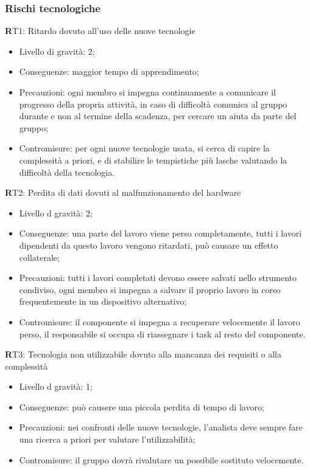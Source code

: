 \subsubsection{Rischi tecnologiche}
\textbf RT1:
 Ritardo dovuto all'uso delle nuove tecnologie
\begin{itemize}
\item Livello di gravità: 2;
\item Conseguenze: maggior tempo di apprendimento;
\item Precauzioni: ogni membro si impegna continuamente a comunicare il progresso della propria attività, in caso di difficoltà comunica al gruppo durante e non al termine della scadenza, per cercare un aiuta da parte del gruppo;
\item Contromisure: per ogni nuove tecnologie usata, si cerca di capire la complessità a priori, e di stabilire le tempistiche più lasche valutando la difficoltà della tecnologia.
\end{itemize}

\textbf RT2: 
Perdita di dati dovuti al malfunzionamento del hardware
\begin{itemize}
\item Livello d gravità: 2;
\item Conseguenze: una parte del lavoro viene perso completamente, tutti i lavori dipendenti da questo lavoro vengono ritardati, può causare un effetto collaterale;
\item Precauzioni: tutti i lavori completati devono essere salvati nello strumento condiviso, ogni membro si impegna a salvare il proprio lavoro in corso frequentemente in un dispositivo alternativo;
\item Contromisure: il componente si impegna a recuperare velocemente il lavoro perso, il responsabile si occupa di riassegnare i task al resto del componente.
\end{itemize}

\textbf RT3: 
Tecnologia non utilizzabile dovuto alla mancanza dei requisiti o alla complessità
\begin{itemize}
\item Livello d gravità: 1;
\item Conseguenze: può causere una piccola perdita di tempo di lavoro;
\item Precauzioni: nei confronti delle nuove tecnologie, l'analista deve sempre fare una ricerca a priori per valutare l'utilizzabilità;
\item Contromisure: il gruppo dovrà rivalutare un possibile sostituto velocemente.
\end{itemize}

